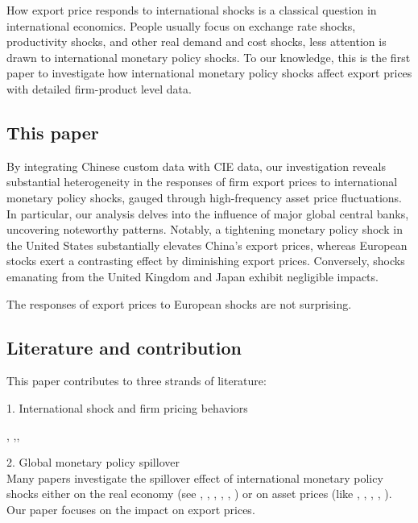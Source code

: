 \documentclass[12pt]{article}
\begin{document}
How export price responds to international shocks is a classical question in international economics. People usually focus on exchange rate shocks, productivity shocks, and other real demand and cost shocks, less attention is drawn to international monetary policy shocks. To our knowledge, this is the first paper to investigate how international monetary policy shocks affect export prices with detailed firm-product level data. 

\subsection{This paper}

By integrating Chinese custom data with CIE data, our investigation reveals substantial heterogeneity in the responses of firm export prices to international monetary policy shocks, gauged through high-frequency asset price fluctuations. In particular, our analysis delves into the influence of major global central banks, uncovering noteworthy patterns. Notably, a tightening monetary policy shock in the United States substantially elevates China's export prices, whereas European stocks exert a contrasting effect by diminishing export prices. Conversely, shocks emanating from the United Kingdom and Japan exhibit negligible impacts.

The responses of export prices to European shocks are not surprising.

\subsection{Literature and contribution}

This paper contributes to three strands of literature: 


1. International shock and firm pricing behaviors

\cite{manova-zhang2012}, \cite{fan-lai-li2015},\cite{fan-li-yeaple2015}, \cite{harrigan2015export}





2. Global monetary policy spillover\\
Many papers investigate the spillover effect of international monetary policy shocks either on the real economy (see \cite{kim2001international}, \cite{faust2003monetary}, \cite{faust2003identifying}, \cite{mackowiak2007external}, \cite{di2008impact}, \cite{bluedorn2011open}) or on asset prices (like \cite{craine2008international}, \cite{wongswan2009response}, \cite{hausman2011global}, \cite{rogers2014evaluating}, \cite{miranda2020us}). Our paper focuses on the impact on export prices.
\end{document}

